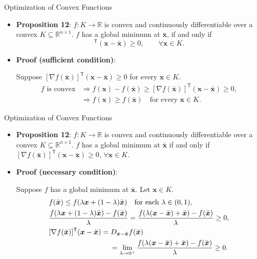 \documentclass[aspectratio=169,hyperref,UTF8,CJK]{beamer}
\newcommand{\R}{\mathbb{R}}
\newcommand{\trans}{\mathsf{T}}
\newcommand{\vect}[1]{\boldsymbol{#1}}
\begin{document}
\begin{frame}{Optimization of Convex Functions}
  \small
  \begin{itemize}
    \item \textbf{Proposition 12}: $f:K\to\R$ is convex and continuously differentiable over a convex $K\subseteq\R^{n\times1}$. $f$ has a global minimum at $\bar{\vect{x}}$, if and only if
      \begin{equation*}
        [\nabla f(\bar{\vect{x}})]^{\trans}(\vect{x}-\bar{\vect{x}})\ge0,
        \qquad\forall\vect{x}\in K.
      \end{equation*}
    \item \textbf{Proof (sufficient condition)}:

      Suppose $[\nabla f(\bar{\vect{x}})]^{\trans}(\vect{x}-\bar{\vect{x}})\ge0$ for every $\vect{x}\in K$.
      \begin{align*}
        f\text{ is convex}
        &\Longrightarrow f(\vect{x})-f(\bar{\vect{x}})
        \ge[\nabla f(\bar{\vect{x}})]^{\trans}(\vect{x}-\bar{\vect{x}})\ge0,\\
        &\Longrightarrow f(\vect{x})\ge f(\bar{\vect{x}})\quad\text{for every }\vect{x}\in K.
      \end{align*}
  \end{itemize}
\end{frame}

\begin{frame}{Optimization of Convex Functions}
  \scriptsize
  \begin{itemize}
    \item \textbf{Proposition 12}: $f:K\to\R$ is convex and continuously differentiable over a convex $K\subseteq\R^{n\times1}$. $f$ has a global minimum at $\bar{\vect{x}}$ if and only if $[\nabla f(\bar{\vect{x}})]^{\trans}(\vect{x}-\bar{\vect{x}})\ge0$, $\forall\vect{x}\in K$.
    \item \textbf{Proof (necessary condition)}:

      Suppose $f$ has a global minimum at $\bar{\vect{x}}$. Let $\vect{x}\in K$.
      \begin{align*}
        &f(\bar{\vect{x}})\le f(\lambda\vect{x}+(1-\lambda)\bar{\vect{x}})
        \quad\text{for each }\lambda\in(0,1),\\
        &\frac{f(\lambda\vect{x}+(1-\lambda)\bar{\vect{x}})-f(\bar{\vect{x}})}{\lambda}
        =\frac{f(\lambda(\vect{x}-\bar{\vect{x}})+\bar{\vect{x}})-f(\bar{\vect{x}})}{\lambda}\ge0,\\
        &[\nabla f(\bar{\vect{x}})]^{\trans}(\vect{x}-\bar{\vect{x}})
        =D_{\vect{x}-\bar{\vect{x}}}f(\bar{\vect{x}})\\
        &\hspace{30mm}=\lim_{\lambda\to0^+}
        \frac{f(\lambda(\vect{x}-\bar{\vect{x}})+\bar{\vect{x}})-f(\bar{\vect{x}})}{\lambda}\ge0.
      \end{align*}
  \end{itemize}
\end{frame}
\end{document}
